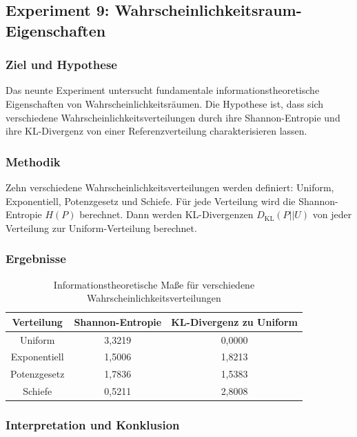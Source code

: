 ﻿\documentclass[a4paper,12pt]{article}
\theoremstyle{definition}
\begin{document}
\subsection{Experiment 9: Wahrscheinlichkeitsraum-Eigenschaften}
\label{exp:probspace}

\subsubsection{Ziel und Hypothese}

Das neunte Experiment untersucht fundamentale informationstheoretische Eigenschaften von Wahrscheinlichkeitsräumen. Die Hypothese ist, dass sich verschiedene Wahrscheinlichkeitsverteilungen durch ihre Shannon-Entropie und ihre KL-Divergenz von einer Referenzverteilung charakterisieren lassen.

\subsubsection{Methodik}

Zehn verschiedene Wahrscheinlichkeitsverteilungen werden definiert: Uniform, Exponentiell, Potenzgesetz und Schiefe. Für jede Verteilung wird die Shannon-Entropie $H(P)$ berechnet. Dann werden KL-Divergenzen $D_{\text{KL}}(P || U)$ von jeder Verteilung zur Uniform-Verteilung berechnet.

\subsubsection{Ergebnisse}

\begin{table}[h]
	\centering
	\begin{tabular}{|c|c|c|}
		\hline
		\textbf{Verteilung} & \textbf{Shannon-Entropie} & \textbf{KL-Divergenz zu Uniform} \\
		\hline
		Uniform & 3,3219 & 0,0000 \\
		\hline
		Exponentiell & 1,5006 & 1,8213 \\
		\hline
		Potenzgesetz & 1,7836 & 1,5383 \\
		\hline
		Schiefe & 0,5211 & 2,8008 \\
		\hline
	\end{tabular}
	\caption{Informationstheoretische Maße für verschiedene Wahrscheinlichkeitsverteilungen}
	\label{tab:exp09_probspace}
\end{table}

\subsubsection{Interpretation und Konklusion}
\end{document}

